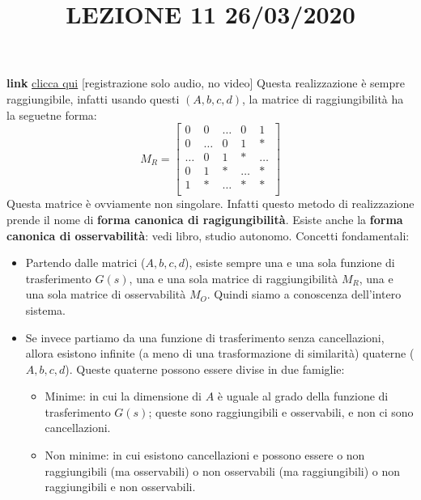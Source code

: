 \newline
\newline
\title{LEZIONE 11 26/03/2020}\newline
\textbf{link} \href{https://web.microsoftstream.com/video/55dca95e-fe7f-4bf2-82e6-d3024939e5c3?list=user&userId=faa91214-a6f5-40d7-8875-253fd49b8ce1}{clicca qui} [registrazione solo audio, no video]\newline
\newline
Questa realizzazione è sempre raggiungibile, infatti usando questi $(A,b,c,d)$, la matrice di raggiungibilità ha la seguetne forma:
\[
    M_R = \left[\begin{matrix}
        0     & 0     & \dots & 0     & 1    \\
        0     & \dots & 0     & 1     & *    \\
        \dots & 0     & 1     & *     & \dots\\
        0     & 1     & *     & \dots & *    \\
        1     & *     & \dots & *     & *    \\
    \end{matrix}\right]
\]
Questa matrice è ovviamente non singolare.\newline
\newline
Infatti questo metodo di realizzazione prende il nome di \textbf{forma canonica di ragigungibilità}.\newline
\newline
Esiste anche la \textbf{forma canonica di osservabilità}: vedi libro, studio autonomo.\newline
\newline
Concetti fondamentali:
\begin{itemize}
    \item Partendo dalle matrici ($A,b,c,d$), esiste sempre una e una sola funzione di trasferimento $G(s)$, una e una sola matrice di raggiungibilità $M_R$, una e una sola matrice di osservabilità $M_O$. Quindi siamo a conoscenza dell'intero sistema.
    \item Se invece partiamo da una funzione di trasferimento senza cancellazioni, allora esistono infinite (a meno di una trasformazione di similarità) quaterne ($A,b,c,d$). Queste quaterne possono essere divise in due famiglie:
    \begin{itemize}
        \item Minime: in cui la dimensione di $A$ è uguale al grado della funzione di trasferimento $G(s)$; queste sono raggiungibili e osservabili, e non ci sono cancellazioni.
        \item Non minime: in cui esistono cancellazioni e possono essere o non raggiungibili (ma osservabili) o non osservabili (ma raggiungibili) o non raggiungibili e non osservabili.
    \end{itemize}
\end{itemize}

